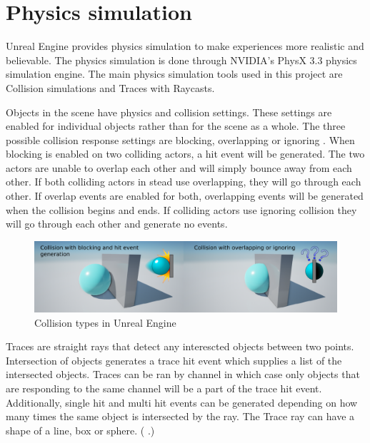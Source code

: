 \documentclass[12pt, a4paper,oneside, nocenter]{thesis}
\newcommand{\citeyeartitlexamk}[1]{(\usebibentry{#1}{title} \citeyear{#1}.)}
\begin{document}
\section{Physics simulation} \label{physics-sim-section}
Unreal Engine provides physics simulation to make experiences more realistic and believable. The physics simulation is done through NVIDIA's PhysX 3.3 physics simulation engine. The main physics simulation tools used in this project are Collision simulations and Traces with Raycasts.
\par
Objects in the scene have physics and collision settings. These settings are enabled for individual objects rather than for the scene as a whole. The three possible collision response settings are blocking, overlapping or ignoring . When blocking is enabled on two colliding actors, a hit event will be generated. The two actors are unable to overlap each other and will simply bounce away from each other. If both colliding actors in stead use overlapping, they will go through each other. If overlap events are enabled for both, overlapping events will be generated when the collision begins and ends. If colliding actors use ignoring collision they will go through each other and generate no events.
\begin{figure}[H]
	\includegraphics[width=\textwidth]{collision-types}
	\caption{Collision types in Unreal Engine}
	\label{fig:collision-types}
\end{figure}
\par
Traces are straight rays that detect any interescted objects between two points. Intersection of objects generates a trace hit event which supplies a list of the intersected objects. Traces can be ran by channel in which case only objects that are responding to the same channel will be a part of the trace hit event. Additionally, single hit and multi hit events can be generated depending on how many times the same object is intersected by the ray. The Trace ray can have a shape of a line, box or sphere. \citeyeartitlexamk{ue-traces}
\end{document}
